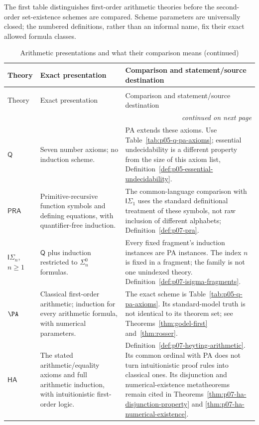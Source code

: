 The first table distinguishes first-order arithmetic theories before the
second-order set-existence schemes are compared. Scheme parameters are
universally closed; the numbered definitions, rather than an informal name,
fix their exact allowed formula classes.

\begingroup\small
\begin{longtable}{@{}p{}p{}p{}@{}}
\caption{Arithmetic presentations and what their comparison means.}
\label{tab:p14-strength-arithmetic}\\
\toprule
Theory & Exact presentation & Comparison and statement/source destination \\
\midrule
\endfirsthead
\caption[]{Arithmetic presentations and what their comparison means (continued)}\\
\toprule
Theory & Exact presentation & Comparison and statement/source destination \\
\midrule
\endhead
\midrule\multicolumn{3}{r}{\emph{continued on next page}}\\
\endfoot
\endlastfoot
\(\mathsf Q\) & Seven number axioms; no induction scheme. &
PA extends these axioms. Use Table~\ref{tab:p05-q-pa-axioms}; essential
undecidability is a different property from the size of this axiom list,
Definition~\ref{def:p05-essential-undecidability}. \\
\addlinespace
\(\mathsf{PRA}\) & Primitive-recursive function symbols and defining
equations, with quantifier-free induction. &
The common-language comparison with \(\mathsf I\Sigma_1\) uses the
standard definitional treatment of these symbols, not raw inclusion of
different alphabets; Definition~\ref{def:p07-pra}. \\
\addlinespace
\(\mathsf I\Sigma_n\), \(n\geq1\) &
\(\mathsf Q\) plus induction restricted to \(\Sigma^0_n\) formulas. &
Every fixed fragment's induction instances are PA instances. The index
\(n\) is fixed in a fragment; the family is not one unindexed theory.
Definition~\ref{def:p07-isigma-fragments}. \\
\addlinespace
\(\PA\) & Classical first-order arithmetic; induction for every arithmetic
formula, with numerical parameters. &
The exact scheme is Table~\ref{tab:p05-q-pa-axioms}. Its standard-model
truth is not identical to its theorem set; see
Theorems~\ref{thm:godel-first} and~\ref{thm:rosser}. \\
\addlinespace
\(\mathsf{HA}\) & The stated arithmetic/equality axioms and full arithmetic
induction, with intuitionistic first-order logic. &
Definition~\ref{def:p07-heyting-arithmetic}. Its common ordinal with PA
does not turn intuitionistic proof rules into classical ones. Its
disjunction and numerical-existence metatheorems remain cited in
Theorems~\ref{thm:p07-ha-disjunction-property} and
\ref{thm:p07-ha-numerical-existence}. \\
\bottomrule
\end{longtable}
\endgroup

